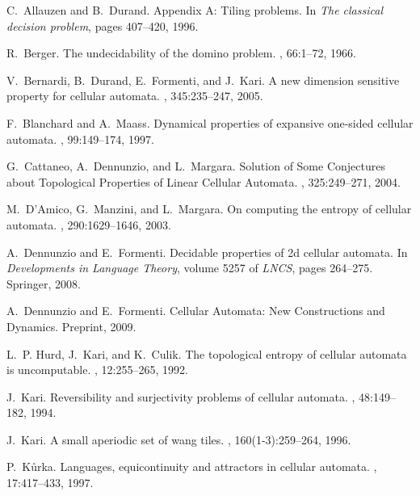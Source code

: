\documentclass{llncs}
\begin{document}
\begin{thebibliography}{10}

C.~Allauzen and B.~Durand.
\newblock Appendix {A}: Tiling problems.
\newblock In {\em The classical decision problem}, pages 407--420, 1996.

R.~Berger.
\newblock The undecidability of the domino problem.
, 66:1--72, 1966.

V.~Bernardi, B.~Durand, E.~Formenti, and J.~Kari.
\newblock A new dimension sensitive property for cellular automata.
, 345:235--247, 2005.

F.~Blanchard and A.~Maass.
\newblock Dynamical properties of expansive one-sided cellular automata.
, 99:149--174, 1997.

G.~Cattaneo, A.~Dennunzio, and L.~Margara.
\newblock Solution of Some Conjectures about Topological Properties of Linear Cellular Automata.
, 325:249--271, 2004.

M.~D'Amico, G.~Manzini, and L.~Margara.
\newblock On computing the entropy of cellular automata.
, 290:1629--1646, 2003.

A.~Dennunzio and E.~Formenti.
\newblock Decidable properties of 2d cellular automata.
\newblock In {\em Developments in Language Theory}, volume 5257 of {\em LNCS},
  pages 264--275. Springer, 2008.

A.~Dennunzio and E.~Formenti.
 {C}ellular {A}utomata: {N}ew {C}onstructions and {D}ynamics.
\newblock Preprint, 2009.

L.~P. Hurd, J.~Kari, and K.~Culik.
\newblock The topological entropy of cellular automata is uncomputable.
, 12:255--265, 1992.

J.~Kari.
\newblock Reversibility and surjectivity problems of cellular automata.
, 48:149--182, 1994.

J.~Kari.
\newblock A small aperiodic set of wang tiles.
, 160(1-3):259--264, 1996.

P.~K{\r{u}}rka.
\newblock Languages, equicontinuity and attractors in cellular automata.
, 17:417--433, 1997.


\end{thebibliography}
\end{document}

